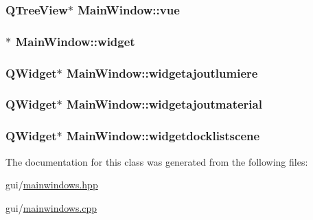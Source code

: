 \hypertarget{class_main_window_ac0150259862bd3b40a76b35a00b9e97a}{
\subsubsection[{vue}]{\setlength{\rightskip}{0pt plus 5cm}Q\+Tree\+View$\ast$ Main\+Window\+::vue\hspace{0.3cm}{\ttfamily [private]}}}\label{class_main_window_ac0150259862bd3b40a76b35a00b9e97a}
\hypertarget{class_main_window_a0a21ff789dee5a19a74d2461cf0820dc}{
\subsubsection[{widget}]{$\ast$ Main\+Window\+::widget\hspace{0.3cm}{\ttfamily [private]}}}\label{class_main_window_a0a21ff789dee5a19a74d2461cf0820dc}
\hypertarget{class_main_window_a9e2c8a96b09dbbfaa041531420603b9e}{
\subsubsection[{widgetajoutlumiere}]{\setlength{\rightskip}{0pt plus 5cm}Q\+Widget$\ast$ Main\+Window\+::widgetajoutlumiere\hspace{0.3cm}{\ttfamily [private]}}}\label{class_main_window_a9e2c8a96b09dbbfaa041531420603b9e}
\hypertarget{class_main_window_a071e7995e629a7b42ddbc5f54eae7dd3}{
\subsubsection[{widgetajoutmaterial}]{\setlength{\rightskip}{0pt plus 5cm}Q\+Widget$\ast$ Main\+Window\+::widgetajoutmaterial\hspace{0.3cm}{\ttfamily [private]}}}\label{class_main_window_a071e7995e629a7b42ddbc5f54eae7dd3}
\hypertarget{class_main_window_a38d553a96a3898e65b500c639673b8de}{
\subsubsection[{widgetdocklistscene}]{\setlength{\rightskip}{0pt plus 5cm}Q\+Widget$\ast$ Main\+Window\+::widgetdocklistscene\hspace{0.3cm}{\ttfamily [private]}}}\label{class_main_window_a38d553a96a3898e65b500c639673b8de}


The documentation for this class was generated from the following files\+:\begin{DoxyCompactItemize}
\item 
gui/\hyperlink{mainwindows_8hpp}{mainwindows.\+hpp}\item 
gui/\hyperlink{mainwindows_8cpp}{mainwindows.\+cpp}\end{DoxyCompactItemize}
